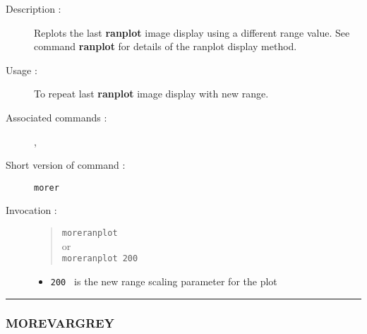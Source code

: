 \begin{description}

\item[Description :] Replots the last {\bf ranplot} image display using a
different range value.  See command {\bf ranplot} for details of the ranplot
display method.

\item[Usage :] To repeat last {\bf ranplot} image display with new range.
\item[Associated commands :] {\tt {}}, 
{\tt {}}
\item[Short version of command :] {\tt morer}
\item[Invocation :]

\begin{quote}{\tt  moreranplot }\\
or \\
{\tt moreranplot 200 }
\end{quote}

\begin{itemize}

\item {\tt 200 } is the new range scaling parameter for the plot
\end{itemize}

\end{description}

\hrule 
\subsubsection*{\label{MOREVARGREY}MOREVARGREY}

